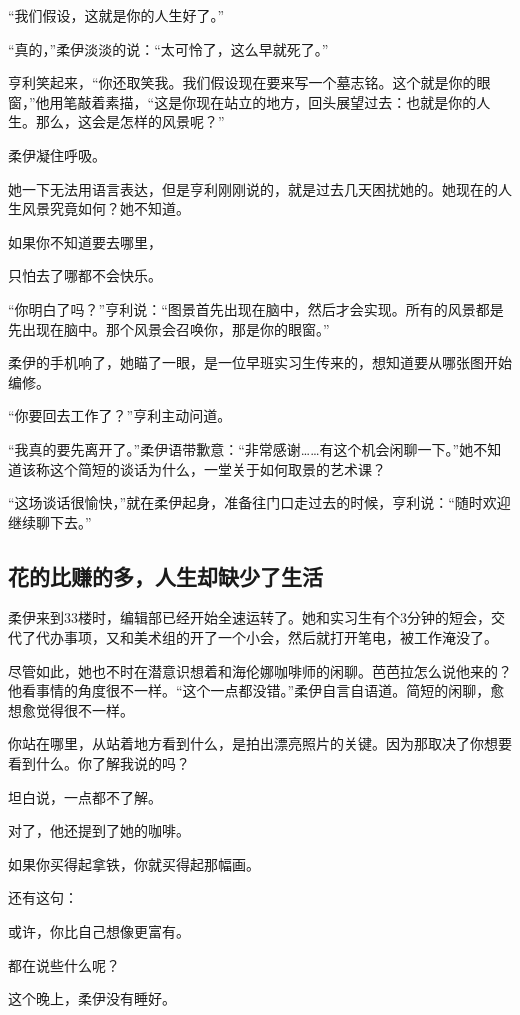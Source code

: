 “我们假设，这就是你的人生好了。”

“真的，”柔伊淡淡的说：“太可怜了，这么早就死了。”

亨利笑起来，“你还取笑我。我们假设现在要来写一个墓志铭。这个就是你的眼窗，”他用笔敲着素描，“这是你现在站立的地方，回头展望过去：也就是你的人生。那么，这会是怎样的风景呢？”

柔伊凝住呼吸。

她一下无法用语言表达，但是亨利刚刚说的，就是过去几天困扰她的。她现在的人生风景究竟如何？她不知道。

{\kaishu 如果你不知道要去哪里，}

{\kaishu 只怕去了哪都不会快乐。}

“你明白了吗？”亨利说：“图景首先出现在脑中，然后才会实现。所有的风景都是先出现在脑中。那个风景会召唤你，那是你的眼窗。”

柔伊的手机响了，她瞄了一眼，是一位早班实习生传来的，想知道要从哪张图开始编修。

“你要回去工作了？”亨利主动问道。

“我真的要先离开了。”柔伊语带歉意：“非常感谢……有这个机会闲聊一下。”她不知道该称这个简短的谈话为什么，一堂关于如何取景的艺术课？

“这场谈话很愉快，”就在柔伊起身，准备往门口走过去的时候，亨利说：“随时欢迎继续聊下去。”

\subsection{花的比赚的多，人生却缺少了生活}

柔伊来到33楼时，编辑部已经开始全速运转了。她和实习生有个3分钟的短会，交代了代办事项，又和美术组的开了一个小会，然后就打开笔电，被工作淹没了。

尽管如此，她也不时在潜意识想着和海伦娜咖啡师的闲聊。芭芭拉怎么说他来的？他看事情的角度很不一样。“这个一点都没错。”柔伊自言自语道。简短的闲聊，愈想愈觉得很不一样。

{\kaishu 你站在哪里，从站着地方看到什么，是拍出漂亮照片的关键。因为那取决了你想要看到什么。你了解我说的吗？}

坦白说，一点都不了解。

对了，他还提到了她的咖啡。

{\kaishu 如果你买得起拿铁，你就买得起那幅画。}

还有这句：

{\kaishu 或许，你比自己想像更富有。}

都在说些什么呢？

这个晚上，柔伊没有睡好。

